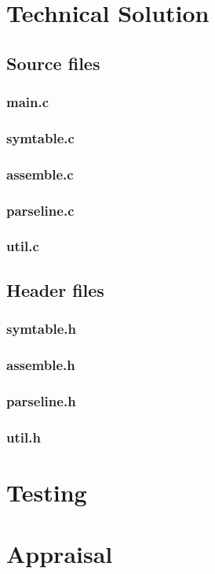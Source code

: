 \documentclass[a4paper]{report}
\begin{document}

\chapter{Technical Solution}

\section{Source files}

\lstset{numbers=left}

\subsection{main.c}

\subsection{symtable.c}

\subsection{assemble.c}

\subsection{parseline.c}

\subsection{util.c}


\section{Header files}

\subsection{symtable.h}

\subsection{assemble.h}

\subsection{parseline.h}

\subsection{util.h}




\chapter{Testing}



\chapter{Appraisal}
\end{document}
